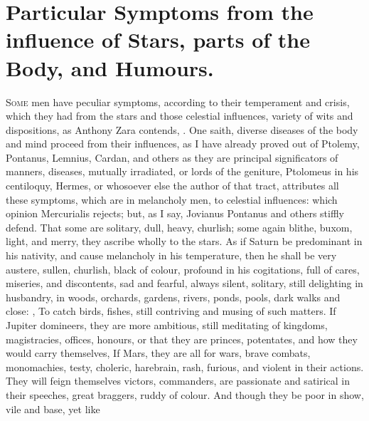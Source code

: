 {%
\section[Symptoms from the influence of Stars]{Particular Symptoms from the influence of Stars, parts of the Body, and Humours.}

\lettrine{S}{ome} men have peculiar symptoms, according to their temperament
and crisis, which they had from the stars and those celestial influences,
variety of wits and dispositions, as Anthony Zara contends,
 . One saith, diverse diseases of the body and
mind proceed from their influences, as I have already
proved out of Ptolemy, Pontanus, Lemnius, Cardan, and others as they are
principal significators of manners, diseases, mutually irradiated, or lords of
the geniture, \etc{} Ptolomeus in his centiloquy, Hermes, or whosoever else the
author of that tract, attributes all these symptoms, which are in melancholy
men, to celestial influences: which opinion Mercurialis  rejects; but, as I say, Jovianus
Pontanus and others stiffly defend. That some are solitary, dull, heavy,
churlish; some again blithe, buxom, light, and merry, they ascribe wholly to
the stars. As if Saturn be predominant in his nativity, and cause melancholy in
his temperature, then he shall be very austere, sullen,
churlish, black of colour, profound in his cogitations, full of cares,
miseries, and discontents, sad and fearful, always silent, solitary, still
delighting in husbandry, in woods, orchards, gardens, rivers, ponds, pools,
dark walks and close: , \etc{} To catch birds, fishes, \etc{} still contriving
and musing of such matters. If Jupiter domineers, they are more ambitious,
still meditating of kingdoms, magistracies, offices, honours, or that they are
princes, potentates, and how they would carry themselves, \etc{} If Mars, they
are all for wars, brave combats, monomachies, testy, choleric, harebrain, rash,
furious, and violent in their actions. They will feign themselves victors,
commanders, are passionate and satirical in their speeches, great braggers,
ruddy of colour. And though they be poor in show, vile and base, yet like
}
